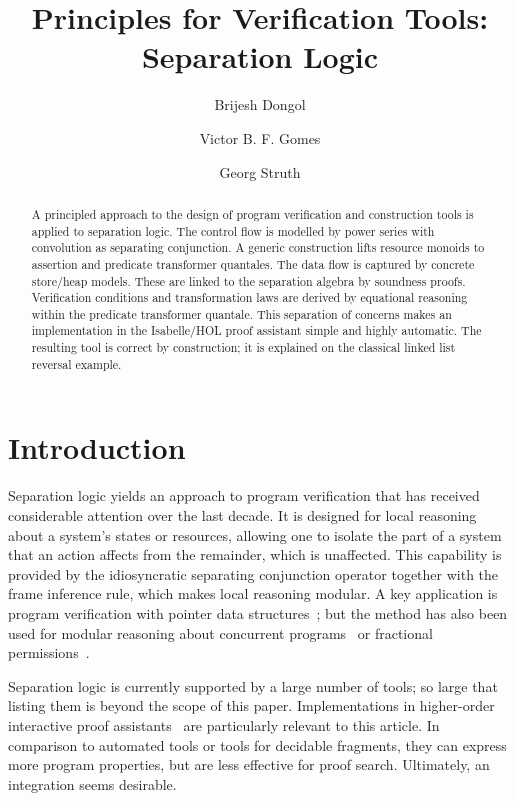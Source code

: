 \documentclass[twoside,runningheads,envcountsame,envcountsect,oribibl,orivec]{llncs}
\title {Principles for Verification Tools: Separation Logic}
\author {
  	Brijesh Dongol
	\and
	Victor B. F. Gomes
	\and 
	Georg Struth 
}
\institute {
	Department of Computer Science, University of Sheffield \\
	\email{\{b.dongol,v.gomes,g.struth\}@shefield.ac.uk}
}
\begin{document}
\maketitle

\begin{abstract}
  A principled approach to the design of program verification and
  construction tools is applied to separation logic. The control flow
  is modelled by power series with convolution as separating
  conjunction. A generic construction lifts resource monoids to
  assertion and predicate transformer quantales. The data flow is
  captured by concrete store/heap models. These are linked to the
  separation algebra by soundness proofs. Verification conditions and
  transformation laws are derived by equational reasoning within the
  predicate transformer quantale.  This separation of concerns makes
  an implementation in the Isabelle/HOL proof assistant simple and
  highly automatic. The resulting tool is correct by construction; it
  is explained on the classical linked list reversal example.


\end{abstract}



\section{Introduction}\label{S:intro}

Separation logic yields an approach to program verification that has
received considerable attention over the last decade. It is designed
for local reasoning about a system's states or resources, allowing one
to isolate the part of a system that an action affects from the
remainder, which is unaffected. This capability is provided by the
idiosyncratic separating conjunction operator together with the frame
inference rule, which makes local reasoning modular.  A key
application is program verification with pointer data
structures~\cite{Reynolds02, OHRY01}; but the method has also been
used for modular reasoning about concurrent
programs~\cite{OHearn07,Vafeiadis} or fractional
permissions~\cite{BornatCOP05}.

Separation logic is currently supported by a large number of tools; so
large that listing them is beyond the scope of this
paper. Implementations in higher-order interactive proof
assistants~\cite{Weber04,Tuerk,ChlipalaMMSW09,NICTA} are particularly
relevant to this article.  In comparison to automated tools or tools
for decidable fragments, they can express more program properties, but
are less effective for proof search. Ultimately, an integration seems
desirable.
\end{document}
